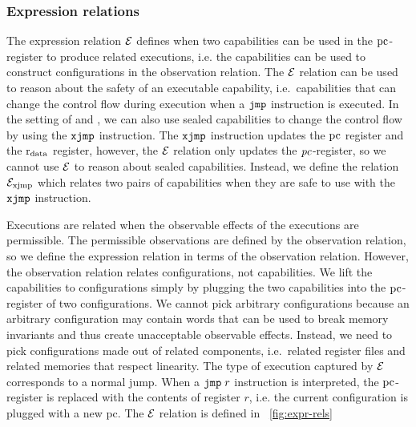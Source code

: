 \begin{jversion}
\subsubsection{Expression relations}
The expression relation $\mathcal{E}$ defines when two capabilities can be used in the $\mathrm{pc}$-register to produce related executions, i.e. the capabilities can be used to construct configurations in the observation relation.
The $\mathcal{E}$ relation can be used to reason about the safety of an executable capability, i.e.\ capabilities that can change the control flow during execution when a $\tjmp{}$ instruction is executed.
In the setting of \srccm{} and \trgcm{}, we can also use sealed capabilities to change the control flow by using the $\txjmp{}{}$ instruction.
The $\txjmp{}{}$ instruction updates the $\mathrm{pc}$ register and the $\mathrm{r}_\mathrm{data}$ register, however, the $\mathcal{E}$ relation only updates the $\mathit{pc}$-register, so we cannot use $\mathcal{E}$ to reason about sealed capabilities.
Instead, we define the relation $\mathcal{E}_\mathrm{xjmp}$ which relates two pairs of capabilities when they are safe to use with the $\txjmp{}{}$ instruction.

Executions are related when the observable effects of the executions are permissible.
The permissible observations are defined by the observation relation, so we define the expression relation in terms of the observation relation.
However, the observation relation relates configurations, not capabilities.
We lift the capabilities to configurations simply by plugging the two capabilities into the $\mathrm{pc}$-register of two configurations.
We cannot pick arbitrary configurations because an arbitrary configuration may contain words that can be used to break memory invariants and thus create unacceptable observable effects.
Instead, we need to pick configurations made out of related components, i.e.\ related register files and related memories that respect linearity.
The type of execution captured by $\mathcal{E}$ corresponds to a normal jump.
When a $\tjmp r$ instruction is interpreted, the $\mathrm{pc}$-register is replaced with the contents of register $r$, i.e. the current configuration is plugged with a new pc.
The $\mathcal{E}$ relation is defined in \figurename~\ref{fig:expr-rels}


\end{jversion}
